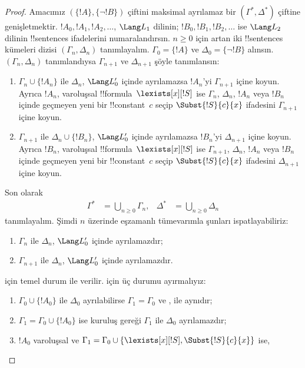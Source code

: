 \documentclass[../../../include/open-logic-section]{subfiles}
\begin{document}
\begin{proof}
Amacımız $(\{!A\},\{\lnot !B\})$ çiftini maksimal ayrılamaz bir
$(\Gamma^*,\Delta^*)$ çiftine genişletmektir. $!A_0,!A_1,!A_2,\dots$,
$\Lang L_1$ dilinin; $!B_0,!B_1,!B_2,\dots$ ise $\Lang L_2$ dilinin
!!{sentence}s ifadelerini numaralandırsın. $n\geq0$ için artan iki
!!{sentence}s kümeleri dizisi $(\Gamma_n,\Delta_n)$ tanımlayalım.
$\Gamma_0=\{!A\}$ ve $\Delta_0=\{\lnot !B\}$ alınsın.
$(\Gamma_n,\Delta_n)$ tanımlandıysa $\Gamma_{n+1}$ ve
$\Delta_{n+1}$ şöyle tanımlansın:
\begin{enumerate}
\item $\Gamma_n\cup\{!A_n\}$ ile $\Delta_n$, $\Lang L'_0$ içinde
  ayrılamazsa $!A_n$'yi $\Gamma_{n+1}$ içine koyun. Ayrıca $!A_n$,
  varoluşsal !!{formula}~$\lexists[x][!S]$ ise $\Gamma_n$,
  $\Delta_n$, $!A_n$ veya $!B_n$ içinde geçmeyen yeni bir
  !!{constant}~$c$ seçip $\Subst{!S}{c}{x}$ ifadesini
  $\Gamma_{n+1}$ içine koyun.
\item $\Gamma_{n+1}$ ile $\Delta_n\cup\{!B_n\}$, $\Lang L'_0$
  içinde ayrılamazsa $!B_n$'yi $\Delta_{n+1}$ içine koyun. Ayrıca
  $!B_n$, varoluşsal !!{formula}~$\lexists[x][!S]$ ise
  $\Gamma_{n+1}$, $\Delta_n$, $!A_n$ veya $!B_n$ içinde geçmeyen yeni
  bir !!{constant}~$c$ seçip $\Subst{!S}{c}{x}$ ifadesini
  $\Delta_{n+1}$ içine koyun.
\end{enumerate}
Son olarak
\begin{align*}
  \Gamma^* & = \bigcup_{n\ge 0} \Gamma_n, &
  \Delta^* & = \bigcup_{n\ge 0} \Delta_n
\end{align*}
tanımlayalım. Şimdi $n$ üzerinde eşzamanlı tümevarımla şunları
ispatlayabiliriz:
\begin{enumerate}
\item{} $\Gamma_n$ ile $\Delta_n$, $\Lang L'_0$ içinde
  ayrılamazdır;
\item{} $\Gamma_{n+1}$ ile $\Delta_n$, $\Lang L'_0$
  içinde ayrılamazdır.
\end{enumerate}
 için temel durum  ile verilir.
 için üç durumu ayırmalıyız:
\begin{enumerate}
\item $\Gamma_0\cup\{!A_0\}$ ile $\Delta_0$ ayrılabilirse
  $\Gamma_1=\Gamma_0$ ve ,  ile aynıdır;
\item $\Gamma_1=\Gamma_0\cup\{!A_0\}$ ise kuruluş gereği
  $\Gamma_1$ ile $\Delta_0$ ayrılamazdır;
\item $!A_0$ varoluşsal ve
  $\Gamma_1=\Gamma_0\cup\{\lexists[x][!S],\Subst{!S}{c}{x}\}$ ise,

\end{enumerate}
\end{proof}
\end{document}
